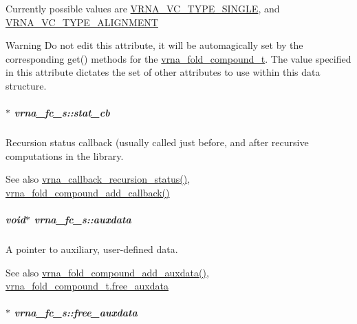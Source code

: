 Currently possible values are \hyperlink{group__fold__compound_gga01a4ff86fa71deaaa5d1abbd95a1447da1608d3aa78905fc39e0d25a624ac9512}{V\+R\+N\+A\+\_\+\+V\+C\+\_\+\+T\+Y\+P\+E\+\_\+\+S\+I\+N\+G\+L\+E}, and \hyperlink{group__fold__compound_gga01a4ff86fa71deaaa5d1abbd95a1447da056345f1bcfe7cd595d1fd437c05246d}{V\+R\+N\+A\+\_\+\+V\+C\+\_\+\+T\+Y\+P\+E\+\_\+\+A\+L\+I\+G\+N\+M\+E\+N\+T} \begin{DoxyWarning}{Warning}
Do not edit this attribute, it will be automagically set by the corresponding get() methods for the \hyperlink{group__fold__compound_ga1b0cef17fd40466cef5968eaeeff6166}{vrna\+\_\+fold\+\_\+compound\+\_\+t}. The value specified in this attribute dictates the set of other attributes to use within this data structure. 
\end{DoxyWarning}
\hypertarget{group__fold__compound_a87a83f6795b569000efcbe65acc3dd81}{}
\subparagraph[{stat\+\_\+cb}]{$\ast$ vrna\+\_\+fc\+\_\+s\+::stat\+\_\+cb}\label{group__fold__compound_a87a83f6795b569000efcbe65acc3dd81}


Recursion status callback (usually called just before, and after recursive computations in the library. 

\begin{DoxySeeAlso}{See also}
\hyperlink{group__fold__compound_ga4a4a0d838de6d18315bafc84f93f5cc0}{vrna\+\_\+callback\+\_\+recursion\+\_\+status()}, \hyperlink{group__fold__compound_ga097ed6133055624667cbce8cfdebf82d}{vrna\+\_\+fold\+\_\+compound\+\_\+add\+\_\+callback()} 
\end{DoxySeeAlso}
\hypertarget{group__fold__compound_a20048e0c369e9f24b55423d600037c68}{}
\subparagraph[{auxdata}]{\setlength{\rightskip}{0pt plus 5cm}void$\ast$ vrna\+\_\+fc\+\_\+s\+::auxdata}\label{group__fold__compound_a20048e0c369e9f24b55423d600037c68}


A pointer to auxiliary, user-\/defined data. 

\begin{DoxySeeAlso}{See also}
\hyperlink{group__fold__compound_ga6316a9426bea2f742375e8df6febd3f6}{vrna\+\_\+fold\+\_\+compound\+\_\+add\+\_\+auxdata()}, \hyperlink{group__fold__compound_a8e84dbabab016ecd74da6c38cb94e816}{vrna\+\_\+fold\+\_\+compound\+\_\+t.\+free\+\_\+auxdata} 
\end{DoxySeeAlso}
\hypertarget{group__fold__compound_a8e84dbabab016ecd74da6c38cb94e816}{}
\subparagraph[{free\+\_\+auxdata}]{$\ast$ vrna\+\_\+fc\+\_\+s\+::free\+\_\+auxdata}\label{group__fold__compound_a8e84dbabab016ecd74da6c38cb94e816}


